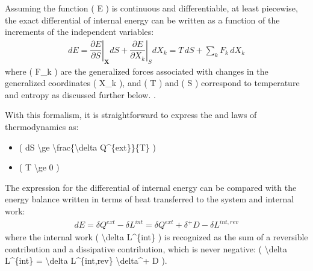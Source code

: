 \documentclass[letterpaper,10pt,english]{jupyterBook}
\begin{document}
\sphinxAtStartPar
Assuming the function ( E ) is continuous and differentiable, at least piecewise, the exact differential of internal energy can be written as a function of the increments of the independent variables:
\begin{equation*}
\begin{split}
dE = \left. \dfrac{\partial E}{\partial S} \right|_{\mathbf{X}} d S + \left. \dfrac{\partial E}{\partial X_k} \right|_{S} d X_k = 
T \, d S + \sum_k F_k \, d X_k
\end{split}
\end{equation*}
\sphinxAtStartPar
where ( F\_k ) are the generalized forces associated with changes in the generalized coordinates ( X\_k ), and ( T ) and ( S ) correspond to temperature and entropy as discussed further below. .

\sphinxAtStartPar
With this formalism, it is straightforward to express the  and  laws of thermodynamics as:
\begin{itemize}
\item {} 
\sphinxAtStartPar
( dS \textbackslash{}ge \textbackslash{}frac\{\textbackslash{}delta Q\textasciicircum{}\{ext\}\}\{T\} )

\item {} 
\sphinxAtStartPar
( T \textbackslash{}ge 0 )

\end{itemize}

\sphinxAtStartPar
The expression for the differential of internal energy can be compared with the energy balance written in terms of heat transferred to the system and internal work:
\begin{equation*}
\begin{split}
dE = \delta Q^{ext} - \delta L^{int} = 
\delta Q^{ext} + \delta^+ D - \delta L^{int,rev}
\end{split}
\end{equation*}
\sphinxAtStartPar
where the internal work ( \textbackslash{}delta L\textasciicircum{}\{int\} ) is recognized as the sum of a reversible contribution and a dissipative contribution, which is never negative: ( \textbackslash{}delta L\textasciicircum{}\{int\} = \textbackslash{}delta L\textasciicircum{}\{int,rev\} \sphinxhyphen{} \textbackslash{}delta\textasciicircum{}+ D ).
\end{document}
